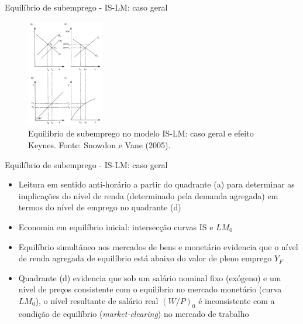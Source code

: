 \documentclass[10pt]{beamer}
\begin{document}
\begin{frame}{Equilíbrio de subemprego - IS-LM: caso geral}
    \begin{figure}
        \centering
        \includegraphics[width=0.3\textwidth]{./figures/aula7_fig1.PNG}
        \caption{Equilíbrio de subemprego no modelo IS-LM: caso geral e efeito Keynes. Fonte: Snowdon e Vane (2005).}
        \label{fig1}
    \end{figure}
\end{frame}

\begin{frame}{Equilíbrio de subemprego - IS-LM: caso geral}
    \begin{itemize}
        \item Leitura em sentido anti-horário a partir do quadrante (a) para determinar as implicações do nível de renda (determinado pela demanda agregada) em termos do nível de emprego no quadrante (d)
        \bigskip
        \item Economia em equilíbrio inicial: intersecção curvas IS e $LM_0$
        \bigskip
        \item Equilíbrio simultâneo nos mercados de bens e monetário evidencia que o nível de renda agregada de equilíbrio está abaixo do valor de pleno emprego $Y_F$
        \bigskip
        \item Quadrante (d) evidencia que sob um salário nominal fixo (exógeno) e um nível de preços consistente com o equilíbrio no mercado monetário (curva $LM_0$), o nível resultante de salário real $(W/P)_0$ é inconsistente com a condição de equilíbrio (\emph{market-clearing}) no mercado de trabalho
    \end{itemize}
\end{frame}
\end{document}
